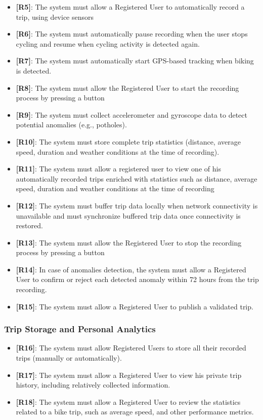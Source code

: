 \begin{itemize}
    \item \textbf{[R5]}: The system must allow a Registered User to automatically record a trip, using device sensors
    \item \textbf{[R6]}: The system must automatically pause recording when the user stops cycling and resume when cycling activity is detected again.
    \item \textbf{[R7]}: The system must automatically start GPS-based tracking when biking is detected.
    \item \textbf{[R8]}: The system must allow the Registered User to start the recording process by pressing a button
    \item \textbf{[R9]}: The system must collect accelerometer and gyroscope data to detect potential anomalies (e.g., potholes).
    \item \textbf{[R10]}: The system must store complete trip statistics (distance, average speed, duration and weather conditions at the time of recording).
    \item \textbf{[R11]}: The system must allow a registered user to view one of his automatically recorded trips enriched with statistics such as distance, average speed, duration and weather conditions at the time of recording
    \item \textbf{[R12]}: The system must buffer trip data locally when network connectivity is unavailable and must synchronize buffered trip data once connectivity is restored.
    \item \textbf{[R13]}: The system must allow the Registered User to stop the recording process by pressing a button
    \item \textbf{[R14]}: In case of anomalies detection, the system must allow a Registered User to confirm or reject each detected anomaly within 72 hours from the trip recording.
    \item \textbf{[R15]}: The system must allow a Registered User to publish a validated trip.
\end{itemize}

\subsubsection{Trip Storage and Personal Analytics}

\begin{itemize}
    \item \textbf{[R16]}: The system must allow Registered Users to store all their recorded trips (manually or automatically).
    \item \textbf{[R17]}: The system must allow a Registered User to view his private trip history, including relatively collected information.
    \item \textbf{[R18]}: The system must allow a Registered User to review the statistics related to a bike trip, such as average speed, and other performance metrics.
\end{itemize}

